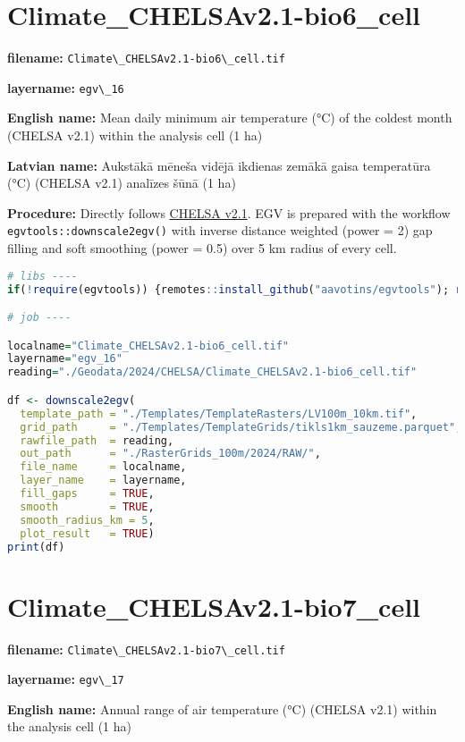 \documentclass[
]{book}
\newcommand{\passthrough}[1]{#1}
\begin{document}
\section{Climate\_CHELSAv2.1-bio6\_cell}\label{ch06.016}

\textbf{filename:} \passthrough{\lstinline!Climate\_CHELSAv2.1-bio6\_cell.tif!}

\textbf{layername:} \passthrough{\lstinline!egv\_16!}

\textbf{English name:} Mean daily minimum air temperature (°C) of the coldest month (CHELSA v2.1) within the analysis cell (1 ha)

\textbf{Latvian name:} Aukstākā mēneša vidējā ikdienas zemākā gaisa temperatūra (°C) (CHELSA v2.1) analīzes šūnā (1 ha)

\textbf{Procedure:} Directly follows \hyperref[Ch04.11]{CHELSA v2.1}. EGV is prepared with the
workflow \passthrough{\lstinline!egvtools::downscale2egv()!} with inverse distance weighted (power = 2)
gap filling and soft smoothing (power = 0.5) over 5 km radius of every cell.

\begin{lstlisting}[language=R]
# libs ----
if(!require(egvtools)) {remotes::install_github("aavotins/egvtools"); require(egvtools)}

# job ----

localname="Climate_CHELSAv2.1-bio6_cell.tif"
layername="egv_16"
reading="./Geodata/2024/CHELSA/Climate_CHELSAv2.1-bio6_cell.tif"

df <- downscale2egv(
  template_path = "./Templates/TemplateRasters/LV100m_10km.tif",
  grid_path     = "./Templates/TemplateGrids/tikls1km_sauzeme.parquet",
  rawfile_path  = reading,
  out_path      = "./RasterGrids_100m/2024/RAW/",
  file_name     = localname,
  layer_name    = layername,
  fill_gaps     = TRUE,
  smooth        = TRUE,
  smooth_radius_km = 5,
  plot_result   = TRUE)
print(df)
\end{lstlisting}

\section{Climate\_CHELSAv2.1-bio7\_cell}\label{ch06.017}

\textbf{filename:} \passthrough{\lstinline!Climate\_CHELSAv2.1-bio7\_cell.tif!}

\textbf{layername:} \passthrough{\lstinline!egv\_17!}

\textbf{English name:} Annual range of air temperature (°C) (CHELSA v2.1) within the analysis cell (1 ha)
\end{document}
